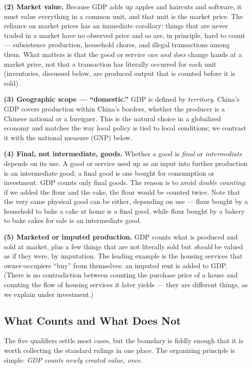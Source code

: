 \textbf{(2) Market value.} Because GDP adds up apples and haircuts and software, it must value everything in a common unit, and that unit is the market price. The reliance on market prices has an immediate corollary: things that are never traded in a market have no observed price and so are, in principle, hard to count --- subsistence production, household chores, and illegal transactions among them. What matters is that the good or service \emph{can and does} change hands at a market price, not that a transaction has literally occurred for each unit (inventories, discussed below, are produced output that is counted before it is sold).

\textbf{(3) Geographic scope --- ``domestic.''} GDP is defined by \emph{territory}. China's GDP covers production within China's borders, whether the producer is a Chinese national or a foreigner. This is the natural choice in a globalized economy and matches the way local policy is tied to local conditions; we contrast it with the national measure (GNP) below.

\textbf{(4) Final, not intermediate, goods.} Whether a good is \emph{final} or \emph{intermediate} depends on its use. A good or service used up as an input into further production is an intermediate good; a final good is one bought for consumption or investment. GDP counts only final goods. The reason is to avoid \emph{double counting}: if we added the flour and the cake, the flour would be counted twice. Note that the very same physical good can be either, depending on use --- flour bought by a household to bake a cake at home is a final good, while flour bought by a bakery to bake cakes for sale is an intermediate good.

\textbf{(5) Marketed or imputed production.} GDP counts what is produced and sold at market, plus a few things that are not literally sold but \emph{should} be valued as if they were, by imputation. The leading example is the housing services that owner-occupiers ``buy'' from themselves: an imputed rent is added to GDP. (There is no contradiction between counting the purchase price of a house and counting the flow of housing services it later yields --- they are different things, as we explain under investment.)

\subsection{What Counts and What Does Not}

The five qualifiers settle most cases, but the boundary is fiddly enough that it is worth collecting the standard rulings in one place. The organizing principle is simple: \emph{GDP counts newly created value, once.}

